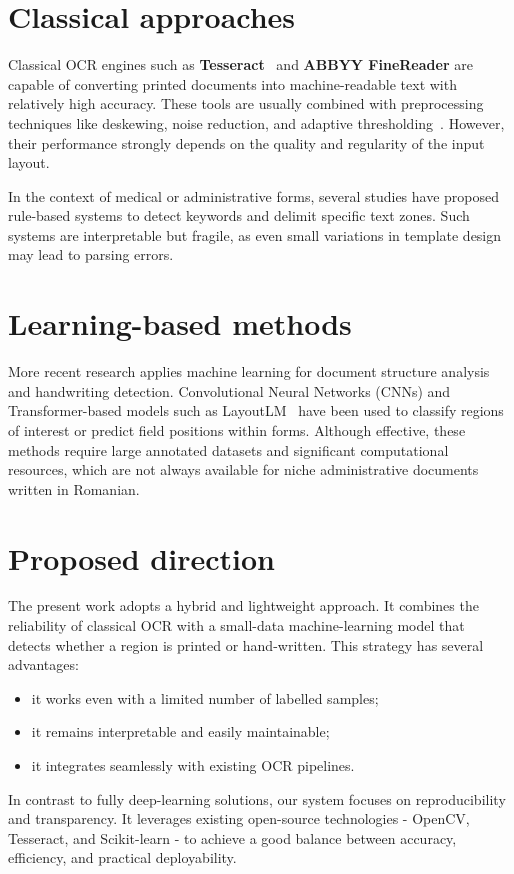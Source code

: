 \documentclass[runningheads,a4paper,11pt]{report}
\begin{document}
\section*{Classical approaches}
Classical OCR engines such as \textbf{Tesseract}~\cite{Smith2007} and \textbf{ABBYY FineReader} are capable of converting printed documents into machine-readable text with relatively high accuracy.
These tools are usually combined with preprocessing techniques like deskewing, noise reduction, and adaptive thresholding~\cite{Niblack1985, Sauvola2000}.
However, their performance strongly depends on the quality and regularity of the input layout.

In the context of medical or administrative forms, several studies have proposed rule-based systems to detect keywords and delimit specific text zones.
Such systems are interpretable but fragile, as even small variations in template design may lead to parsing errors.

\section*{Learning-based methods}
More recent research applies machine learning for document structure analysis and handwriting detection.
Convolutional Neural Networks (CNNs) and Transformer-based models such as LayoutLM~\cite{Xu2020} have been used to classify regions of interest or predict field positions within forms.
Although effective, these methods require large annotated datasets and significant computational resources, which are not always available for niche administrative documents written in Romanian.

\section*{Proposed direction}
The present work adopts a hybrid and lightweight approach.
It combines the reliability of classical OCR with a small-data machine-learning model that detects whether a region is printed or hand-written.
This strategy has several advantages:
\begin{itemize}
  \item it works even with a limited number of labelled samples;
  \item it remains interpretable and easily maintainable;
  \item it integrates seamlessly with existing OCR pipelines.
\end{itemize}

In contrast to fully deep-learning solutions, our system focuses on reproducibility and transparency.
It leverages existing open-source technologies - OpenCV, Tesseract, and Scikit-learn - to achieve a good balance between accuracy, efficiency, and practical deployability.
\end{document}
